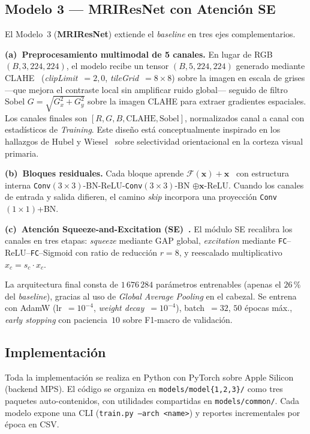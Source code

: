 \documentclass[conference]{IEEEtran}
\begin{document}
\subsection{Modelo 3 --- MRIResNet con Atención SE}
\label{sec:art-m3}

El Modelo~3 (\textbf{MRIResNet}) extiende el \textit{baseline}
en tres ejes complementarios.

\textbf{(a)~Preprocesamiento multimodal de 5 canales.} En lugar
de RGB $(B,3,224,224)$, el modelo recibe un tensor
$(B,5,224,224)$ generado mediante
CLAHE~\cite{zuiderveld1994clahe}
(\textit{clipLimit}~$=2{,}0$, \textit{tileGrid}~$=8{\times}8$)
sobre la imagen en escala de grises ---que mejora el contraste
local sin amplificar ruido global--- seguido de filtro Sobel
$G{=}\sqrt{G_x^2{+}G_y^2}$ sobre la imagen CLAHE para extraer
gradientes espaciales. Los canales finales son
$[R,G,B,\text{CLAHE},\text{Sobel}]$, normalizados canal a canal
con estadísticos de \textit{Training}. Este diseño está
conceptualmente inspirado en los hallazgos de Hubel y
Wiesel~\cite{hubel1959receptive} sobre selectividad
orientacional en la corteza visual primaria.

\textbf{(b)~Bloques residuales.} Cada bloque aprende
$\mathcal{F}(\mathbf{x}){+}\mathbf{x}$~\cite{he2016resnet}
con estructura interna
\texttt{Conv}$(3{\times}3)$-BN-ReLU-\texttt{Conv}$(3{\times}3)$-BN%
$\oplus\mathbf{x}$-ReLU. Cuando los canales de entrada y salida
difieren, el camino \textit{skip} incorpora una proyección
\texttt{Conv}$(1{\times}1)$+BN.

\textbf{(c)~Atención Squeeze-and-Excitation
(SE)~\cite{hu2018senet}.} El módulo SE recalibra los canales
en tres etapas: \emph{squeeze} mediante GAP global, \emph{excitation}
mediante \texttt{FC}--ReLU--\texttt{FC}--Sigmoid con ratio de
reducción $r{=}8$, y reescalado multiplicativo
$\hat{x}_c{=}s_c\cdot x_c$.

La arquitectura final consta de $1\,676\,284$ parámetros
entrenables (apenas el $26$\,\% del \textit{baseline}), gracias
al uso de \textit{Global Average Pooling} en el cabezal. Se
entrena con AdamW (lr~$=10^{-4}$, \textit{weight decay}~$=10^{-4}$),
batch~$=32$, $50$ épocas máx., \textit{early stopping} con
paciencia~$10$ sobre F1-macro de validación.

\subsection{Implementación}

Toda la implementación se realiza en Python con PyTorch sobre
Apple Silicon (backend MPS). El código se organiza en
\texttt{models/model\{1,2,3\}/} como tres paquetes
auto-contenidos, con utilidades compartidas en
\texttt{models/common/}. Cada modelo expone una CLI
(\texttt{train.py --arch <name>}) y reportes incrementales por
época en CSV.
\end{document}
